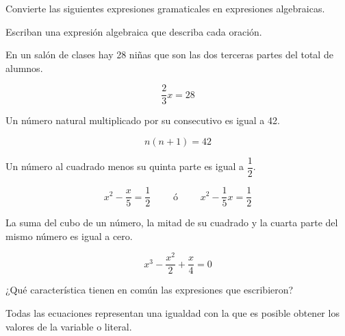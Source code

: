 Convierte las siguientes expresiones gramaticales en expresiones algebraicas.

\begin{parts}

    Escriban una expresión algebraica que describa cada oración.

    \begin{subparts}

        \subpart En un salón de clases hay 28 niñas que son las dos terceras partes del total de alumnos.

        \begin{solutionbox}{1.6cm}
            \[\dfrac{2}{3}x=28\]
        \end{solutionbox}

        \subpart Un número natural multiplicado por su consecutivo es igual a 42.

        \begin{solutionbox}{1.6cm}
            \[n\left(n+1\right)=42\]
        \end{solutionbox}

        \subpart Un número al cuadrado menos su quinta parte es igual a $\dfrac{1}{2}$.

        \begin{solutionbox}{1.6cm}
            \[x^2-\dfrac{x}{5}=\dfrac{1}{2} \qquad\text{ ó }\qquad x^2-\dfrac{1}{5}x=\dfrac{1}{2}\]
        \end{solutionbox}

        \subpart La suma del cubo de un número, la mitad de su cuadrado y la cuarta parte del mismo número es igual a cero.

        \begin{solutionbox}{1.6cm}
            \[x^3-\dfrac{x^2}{2}+\dfrac{x}{4}=0\]
        \end{solutionbox}

    \end{subparts}

    ¿Qué característica tienen en común las expresiones que escribieron?

    \begin{solutionbox}{2cm}
        Todas las ecuaciones representan una igualdad con la que es posible obtener los valores de la variable o literal.
    \end{solutionbox}
\end{parts}